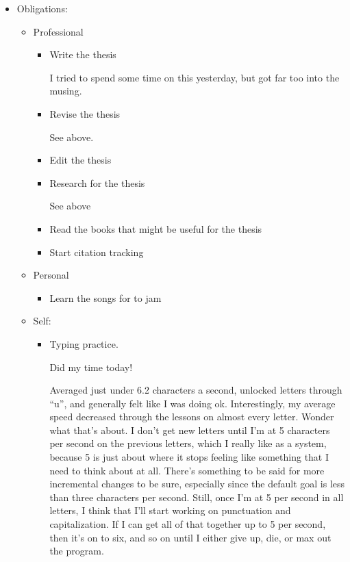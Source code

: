\documentclass[12pt]{article}
\newcommand{\say}[1]{``#1''}
\renewcommand{\,}{\textsuperscript{,}}
\begin{document}
\begin{itemize}

\item Obligations:

\begin{itemize}

\item Professional

\begin{itemize}

\item Write the thesis

I tried to spend some time on this yesterday, but got far too into the musing.

\item Revise the thesis

See above.

\item Edit the thesis

\item Research for the thesis

See above

\item Read the books that might be useful for the thesis

\item Start citation tracking

\end{itemize}

\item Personal

\begin{itemize}

\item Learn the songs for to jam

\end{itemize}

\item Self:

\begin{itemize}

\item Typing practice.

Did my time today!

Averaged just under 6.2 characters a second, unlocked letters through \say{u}, and generally felt like I was doing ok.  
Interestingly, my average speed decreased through the lessons on almost every letter. Wonder what that's about. I don't get new letters until I'm at 5 characters per second on the previous letters, which I really like as a system, because 5 is just about where it stops feeling like something that I need to think about at all.  
There's something to be said for more incremental changes to be sure, especially since the default goal is less than three characters per second.  
Still, once I'm at 5 per second in all letters, I think that I'll start working on punctuation and capitalization.  
If I can get all of that together up to 5 per second, then it's on to six, and so on until I either give up, die, or max out the program.


\end{itemize}
\end{itemize}
\end{itemize}
\end{document}
